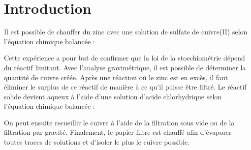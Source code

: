 \documentclass[11pt]{article}
\begin{document}

\section*{Introduction}
Il est possible de chauffer du zinc avec une solution de sulfate de cuivre(II) selon l'équation chimique balancée :
\begin{center}
\end{center}
Cette expérience a pour but de confirmer que la loi de la stoechiométrie dépend du réactif limitant. Avec l'analyse gravimétrique, il est possible de déterminer la quantité de cuivre créée. Après une réaction où le zinc est en excès, il faut éliminer le surplus de ce réactif de manière à ce qu'il puisse être filtré. Le réactif solide devient aqueux à l'aide d'une solution d'acide chlorhydrique selon l'équation chimique balancée :
\begin{center}
\end{center}
On peut ensuite recueillir le cuivre à l'aide de la filtration sous vide ou de la filtration par gravité. Finalement, le papier filtre est chauffé afin d'évaporer toutes traces de solutions et d'isoler le plus le cuivre possible.

\end{document}
